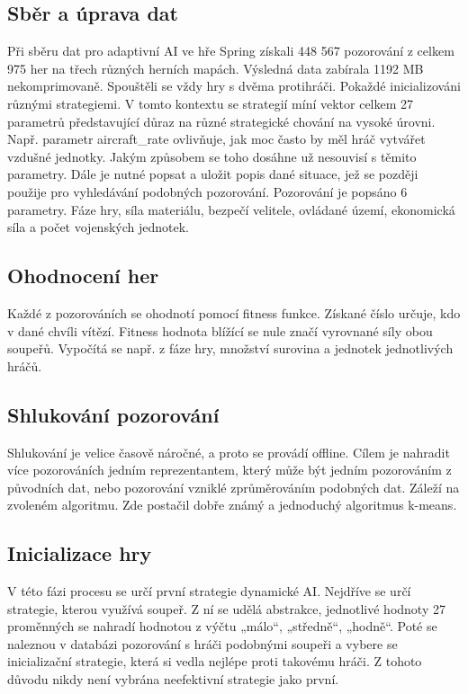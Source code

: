 \subsection{Sběr a úprava dat}

Při sběru dat pro adaptivní AI ve hře Spring získali 448 567 pozorování z celkem 975 her na třech různých herních mapách. Výsledná data zabírala 1192 MB nekomprimovaně. Spouštěli se vždy hry s dvěma protihráči. Pokaždé inicializováni různými strategiemi. V tomto kontextu se strategií míní vektor celkem 27 parametrů představující důraz na různé strategické chování na vysoké úrovni. Např. parametr aircraft\_rate ovlivňuje, jak moc často by měl hráč vytvářet vzdušné jednotky. Jakým způsobem se toho dosáhne už nesouvisí s těmito parametry. Dále je nutné popsat a uložit popis dané situace, jež se později použije pro vyhledávání podobných pozorování. Pozorování je popsáno 6 parametry. Fáze hry, síla materiálu, bezpečí velitele, ovládané území, ekonomická síla a počet vojenských jednotek.

\subsection{Ohodnocení her}

Každé z pozorováních se ohodnotí pomocí fitness funkce. Získané číslo určuje, kdo v dané chvíli vítězí. Fitness hodnota blížící se nule značí vyrovnané síly obou soupeřů. Vypočítá se např. z fáze hry, množství surovina a jednotek jednotlivých hráčů.

\subsection{Shlukování pozorování}

Shlukování je velice časově náročné, a proto se provádí offline. Cílem je nahradit více pozorováních jedním reprezentantem, který může být jedním pozorováním z původních dat, nebo pozorování vzniklé zprůměrováním podobných dat. Záleží na zvoleném algoritmu. Zde postačil dobře známý a jednoduchý algoritmus k-means.

\subsection{Inicializace hry}

V této fázi procesu se určí první strategie dynamické AI. Nejdříve se určí strategie, kterou využívá soupeř. Z ní se udělá abstrakce, jednotlivé hodnoty 27 proměnných se nahradí hodnotou z výčtu „málo“, „středně“, „hodně“.  Poté se naleznou v databázi pozorování s hráči podobnými soupeři a vybere se inicializační strategie, která si vedla nejlépe proti takovému hráči. Z tohoto důvodu nikdy není vybrána neefektivní strategie jako první.

